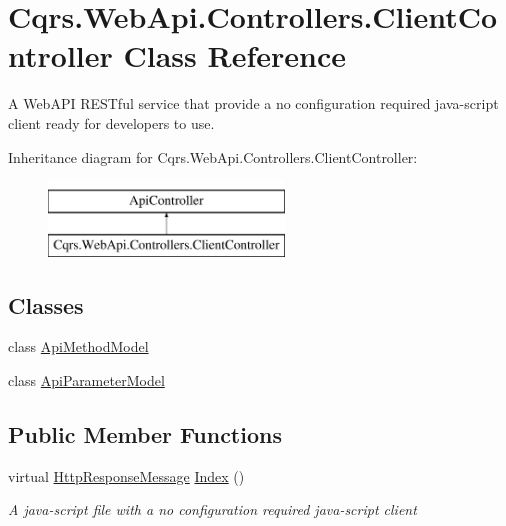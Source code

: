 \hypertarget{classCqrs_1_1WebApi_1_1Controllers_1_1ClientController}{}\section{Cqrs.\+Web\+Api.\+Controllers.\+Client\+Controller Class Reference}
\label{classCqrs_1_1WebApi_1_1Controllers_1_1ClientController}


A Web\+A\+PI R\+E\+S\+Tful service that provide a \textquotesingle{}no configuration required\textquotesingle{} java-\/script client ready for developers to use.  


Inheritance diagram for Cqrs.\+Web\+Api.\+Controllers.\+Client\+Controller\+:\begin{figure}[H]
\begin{center}
\leavevmode
\includegraphics[height=2.000000cm]{classCqrs_1_1WebApi_1_1Controllers_1_1ClientController}
\end{center}
\end{figure}
\subsection*{Classes}
\begin{DoxyCompactItemize}
\item 
class \hyperlink{classCqrs_1_1WebApi_1_1Controllers_1_1ClientController_1_1ApiMethodModel}{Api\+Method\+Model}
\item 
class \hyperlink{classCqrs_1_1WebApi_1_1Controllers_1_1ClientController_1_1ApiParameterModel}{Api\+Parameter\+Model}
\end{DoxyCompactItemize}
\subsection*{Public Member Functions}
\begin{DoxyCompactItemize}
\item 
virtual \hyperlink{classCqrs_1_1WebApi_1_1HttpResponseMessage}{Http\+Response\+Message} \hyperlink{classCqrs_1_1WebApi_1_1Controllers_1_1ClientController_abcd1d9049d9e3cee06558ccf055639f3_abcd1d9049d9e3cee06558ccf055639f3}{Index} ()
\begin{DoxyCompactList}\small\item\em A java-\/script file with a \textquotesingle{}no configuration required\textquotesingle{} java-\/script client \end{DoxyCompactList}\end{DoxyCompactItemize}


